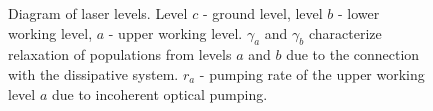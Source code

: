 \begin{figure}
\centering



\caption{Diagram of laser levels. Level $c$ - ground level, level $b$ - lower working level, $a$ - upper working level. $\gamma_a$ and $\gamma_b$ characterize relaxation of populations from levels $a$ and $b$ due to the connection with the dissipative system. $r_a$ - pumping rate of the upper working level $a$ due to incoherent optical pumping.}
\label{figPart2Laser2_1}
\end{figure}